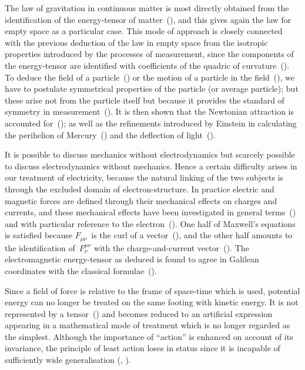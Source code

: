 \documentclass[12pt]{book}
\begin{document}
The law of gravitation in continuous matter is most directly obtained from
the identification of the energy-tensor of matter~(), and this gives again the
law for empty space as a particular case. This mode of approach is closely
connected with the previous deduction of the law in empty space from the
isotropic properties introduced by the processes of measurement, since the
components of the energy-tensor are identified with coefficients of the quadric
of curvature~(). To deduce the field of a particle~() or the motion of a
particle in the field~(), we have to postulate symmetrical properties of the
particle (or average particle); but these arise not from the particle itself but
because it provides the standard of symmetry in measurement~(). It is then
shown that the Newtonian attraction is accounted for~(); as well as the
refinements introduced by Einstein in calculating the perihelion of Mercury~()
and the deflection of light~().

It is possible to discuss mechanics without electrodynamics but scarcely
possible to discuss electrodynamics without mechanics. Hence a certain difficulty
arises in our treatment of electricity, because the natural linking of the
two subjects is through the excluded domain of electron-structure. In practice
electric and magnetic forces are defined through their mechanical effects on
charges and currents, and these mechanical effects have been investigated in
general terms~() and with particular reference to the electron~(). One
half of Maxwell's equations is satisfied because $F_{\mu\nu}$~is the curl of a vector~(),
and the other half amounts to the identification of~$F_{\nu}^{\mu\nu}$ with the charge-and-current
vector~(). The electromagnetic energy-tensor as deduced is found
to agree in Galilean coordinates with the classical formulae~().

Since a field of force is relative to the frame of space-time which is used,
potential energy can no longer be treated on the same footing with kinetic
energy. It is not represented by a tensor~() and becomes reduced to an
artificial expression appearing in a mathematical mode of treatment which is
no longer regarded as the simplest. Although the importance of ``action'' is
enhanced on account of its invariance, the principle of least action loses in
status since it is incapable of sufficiently wide generalisation (, ).
\end{document}

